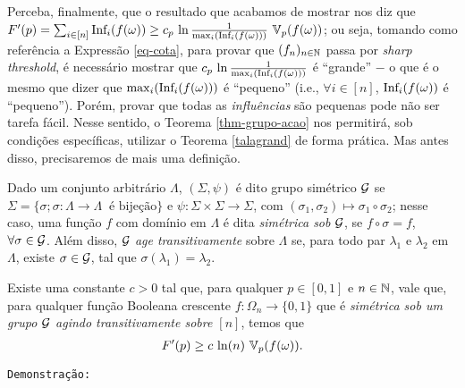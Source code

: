 \par Perceba, finalmente, que o resultado que acabamos de mostrar nos diz que $F'(p) = \sum_{i \in [n]} \text{Inf}_i(f(\omega)) \geq c_p \, \ln\frac{1}{\max_i(\text{Inf}_i(f(\omega)))} \, \operatorname{\mathbb{V}}_p(f(\omega))$; ou seja, tomando como referência a Expressão \eqref{eq-cota}, para provar que $(f_n)_{n \in \operatorname{\mathbb{N}}}$ passa por \textit{sharp threshold}, é necessário mostrar que $c_p \, \ln\frac{1}{\max_i(\text{Inf}_i(f(\omega)))}$ é ``grande'' $-$ o que é o mesmo que dizer que $\max_i(\text{Inf}_i(f(\omega)))$ é ``pequeno'' (i.e., $\forall i \in [n]$, $\text{Inf}_i(f(\omega))$ é ``pequeno''). Porém, provar que todas as \textit{influências} são pequenas pode não ser tarefa fácil. Nesse sentido, o Teorema \ref{thm-grupo-acao} nos permitirá, sob condições específicas, utilizar o Teorema \ref{talagrand} de forma prática. Mas antes disso, precisaremos de mais uma definição. 

\begin{mydef}
	Dado um conjunto arbitrário $\Lambda$, $(\Sigma, \psi)$ é dito grupo simétrico $\operatorname{\mathcal{G}}$ se $\Sigma = \{\sigma; \sigma:\Lambda\longrightarrow\Lambda\ \text{ é bijeção}\}$ e $\psi:\Sigma\times\Sigma\longrightarrow\Sigma$, com $(\sigma_1, \sigma_2) \mapsto \sigma_1 \circ \sigma_2$; nesse caso, uma função $f$ com domínio em $\Lambda$ é dita \textit{simétrica sob $\operatorname{\mathcal{G}}$}, se $f \circ \sigma = f$, $\forall \sigma \in \operatorname{\mathcal{G}}$. Além disso, $\operatorname{\mathcal{G}}$ \textit{age transitivamente} sobre $\Lambda$ se, para todo par $\lambda_1$ e $\lambda_2$ em $\Lambda$, existe $\sigma \in \operatorname{\mathcal{G}}$, tal que $\sigma(\lambda_1) = \lambda_2$.
\end{mydef}

\begin{mythm}\label{thm-grupo-acao}
	Existe uma constante $c > 0$ tal que, para qualquer $p \in [0,1]$ e $n \in \operatorname{\mathbb{N}}$, vale que, para qualquer função Booleana crescente $f: \Omega_n \longrightarrow \{0,1\}$ que é \textit{simétrica sob um grupo $\operatorname{\mathcal{G}}$ agindo transitivamente sobre $[n]$}, temos que
	\begin{align*}
		F'(p) \geq c \, \ln(n) \, \operatorname{\mathbb{V}}_p(f(\omega)).
	\end{align*}
\end{mythm}

\par \texttt{Demonstração:}

